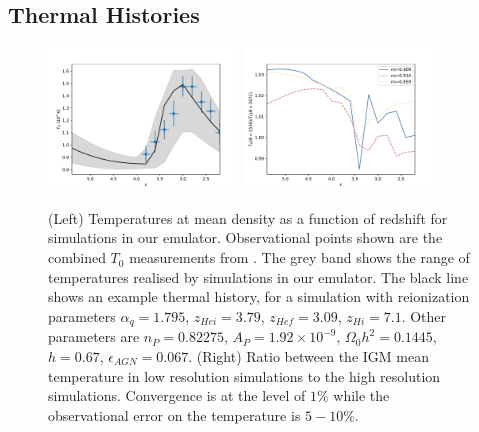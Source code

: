 \documentclass[a4paper,11pt]{article}
\newcommand{\spb}[1]{{\textcolor{magenta}{[{\bf SPB}: #1]}}}
\begin{document}


\subsection{Thermal Histories}

\begin{figure}
\includegraphics[width=0.45\textwidth]{figures/mean-temperature.pdf}
\includegraphics[width=0.45\textwidth]{figures/mean-temperature-resolution.pdf}
 \caption{(Left) Temperatures at mean density as a function of redshift for simulations in our emulator. Observational points shown are the combined $T_0$ measurements from \protect\cite{Gaikwad:2021}.  The grey band shows the range of temperatures realised by simulations in our emulator. The black line shows an example thermal history, for a simulation with reionization parameters $\alpha_q = 1.795$, $z_{Hei} = 3.79$, $z_{Hef} = 3.09$, $z_{Hi} = 7.1$. Other parameters are $n_P = 0.82275$, $A_P = 1.92 \times 10^{-9}$, $\Omega_0 h^2 = 0.1445$, $h = 0.67$, $\epsilon_{AGN} = 0.067$.
 (Right) Ratio between the IGM mean temperature in low resolution simulations to the high resolution simulations. Convergence is at the level of $1\%$ while the observational error on the temperature is $5-10\%$.
}
 \label{fig:meanigmtempdens}
\end{figure}
\end{document}
